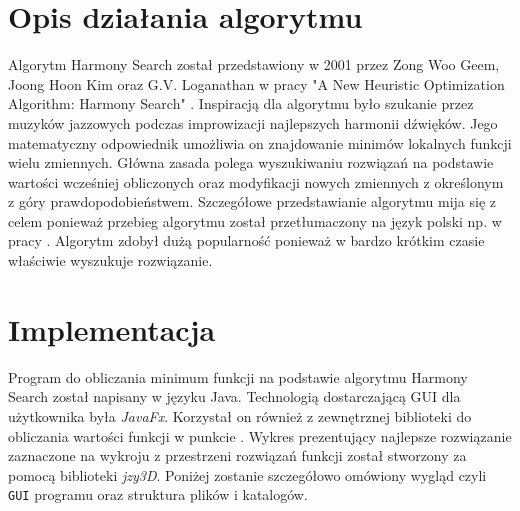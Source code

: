 \documentclass[10pt, a4paper]{article}
\begin{document}
\section{Opis działania algorytmu}
\label{sec:opis}
Algorytm Harmony Search został przedstawiony w 2001 przez Zong Woo Geem, Joong Hoon Kim oraz G.V. Loganathan w pracy "A New Heuristic Optimization Algorithm: Harmony Search" \cite{bib:orginal}. Inspiracją dla algorytmu było szukanie przez muzyków jazzowych podczas improwizacji najlepszych harmonii dźwięków. Jego matematyczny odpowiednik umożliwia on znajdowanie minimów lokalnych funkcji wielu zmiennych. Główna zasada polega wyszukiwaniu rozwiązań na podstawie wartości wcześniej obliczonych oraz modyfikacji nowych zmiennych z określonym z góry prawdopodobieństwem. Szczegółowe przedstawianie algorytmu mija się z celem ponieważ przebieg algorytmu został przetłumaczony na język polski np. w pracy \cite{bib:tlumaczenie}. Algorytm zdobył dużą popularność ponieważ w bardzo krótkim czasie właściwie wyszukuje rozwiązanie.

\section{Implementacja}
\label{sec:implementacja}
Program do obliczania minimum funkcji na podstawie algorytmu Harmony Search został napisany w języku Java. Technologią dostarczającą GUI dla użytkownika była {\em JavaFx}. Korzystał on również z zewnętrznej biblioteki do obliczania wartości funkcji w punkcie \cite{bib:mathparser}. Wykres prezentujący najlepsze rozwiązanie zaznaczone na wykroju z przestrzeni rozwiązań funkcji został stworzony za pomocą biblioteki {\em jzy3D}. Poniżej zostanie szczegółowo omówiony wygląd czyli {\tt GUI} programu oraz struktura plików i katalogów.
\end{document}
